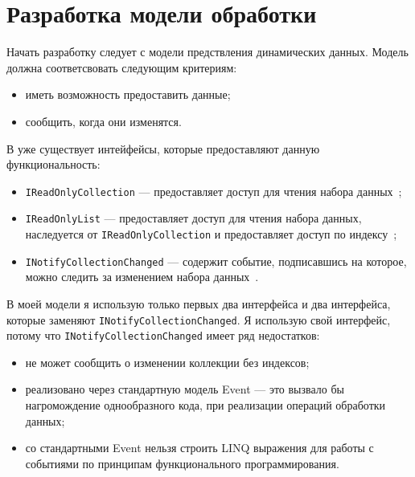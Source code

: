 \chapter{Разработка модели обработки}
\label{sec:research:development_model}

Начать разработку следует с модели предствления динамических данных. Модель должна соответсвовать следующим критериям:

\begin{itemize}
  \item иметь возможность предоставить данные;
  \item сообщить, когда они изменятся.
\end{itemize}

В \dotnet{} уже существует интейфейсы, которые предоставляют данную функциональность:

\begin{itemize}
  \item \lstinline[style=csharpinlinestyle]!IReadOnlyCollection! --- предоставляет доступ для чтения набора данных~\cite{ireadonlycollection};
  \item \lstinline[style=csharpinlinestyle]!IReadOnlyList! --- предоставляет доступ для чтения набора данных,
  наследуется от \lstinline[style=csharpinlinestyle]!IReadOnlyCollection! и предоставляет доступ по индексу~\cite{ireadonlylist};
  \item \lstinline[style=csharpinlinestyle]!INotifyCollectionChanged! --- содержит событие, подписавшись на которое, можно следить за изменением набора данных~\cite{inotifycollectionchanged}.
\end{itemize}

В моей модели я использую только первых два интерфейса и два интерфейса, которые заменяют \lstinline[style=csharpinlinestyle]!INotifyCollectionChanged!.
Я использую свой интерфейс, потому что \lstinline[style=csharpinlinestyle]!INotifyCollectionChanged! имеет ряд недостатков:

\begin{itemize}
  \item не может сообщить о изменении коллекции без индексов;
  \item реализовано через стандартную модель Event --- это вызвало бы нагромождение однообразного кода, при реализации операций обработки данных;
  \item со стандартными Event нельзя строить LINQ выражения для работы с событиями по принципам функционального программирования.
\end{itemize}

